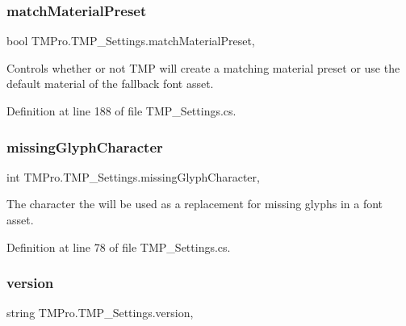 \subsubsection{\texorpdfstring{matchMaterialPreset}{matchMaterialPreset}}
{\footnotesize\ttfamily bool T\+M\+Pro.\+T\+M\+P\+\_\+\+Settings.\+match\+Material\+Preset\hspace{0.3cm}{\ttfamily [static]}, {\ttfamily [get]}}



Controls whether or not T\+MP will create a matching material preset or use the default material of the fallback font asset. 



Definition at line 188 of file T\+M\+P\+\_\+\+Settings.\+cs.

\mbox{\label{class_t_m_pro_1_1_t_m_p___settings_ad2690f7fd21007a9146f94d898154761}} 
\subsubsection{\texorpdfstring{missingGlyphCharacter}{missingGlyphCharacter}}
{\footnotesize\ttfamily int T\+M\+Pro.\+T\+M\+P\+\_\+\+Settings.\+missing\+Glyph\+Character\hspace{0.3cm}{\ttfamily [static]}, {\ttfamily [get]}}



The character the will be used as a replacement for missing glyphs in a font asset. 



Definition at line 78 of file T\+M\+P\+\_\+\+Settings.\+cs.

\mbox{\label{class_t_m_pro_1_1_t_m_p___settings_a38df8ce7c134d19b17a3eb3a761eba67}} 
\subsubsection{\texorpdfstring{version}{version}}
{\footnotesize\ttfamily string T\+M\+Pro.\+T\+M\+P\+\_\+\+Settings.\+version\hspace{0.3cm}{\ttfamily [static]}, {\ttfamily [get]}}



